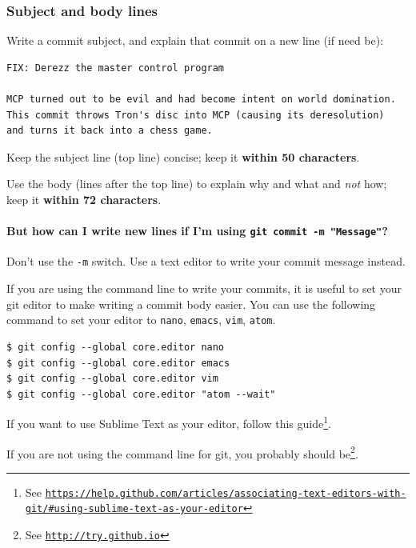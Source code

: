 \documentclass[12pt,a4paper,]{article}
\renewcommand{\href}[2]{#2\footnote{See \texttt{\url{#1}}}}
\let\oldparagraph\paragraph
\renewcommand{\paragraph}[1]{\oldparagraph{#1}\mbox{}}
\begin{document}
\hypertarget{subject-and-body-lines}{\subsubsection{Subject and body
lines}\label{subject-and-body-lines}}

Write a commit subject, and explain that commit on a new line (if need
be):

\begin{verbatim}
FIX: Derezz the master control program

MCP turned out to be evil and had become intent on world domination.
This commit throws Tron's disc into MCP (causing its deresolution)
and turns it back into a chess game.
\end{verbatim}

Keep the subject line (top line) concise; keep it \textbf{within 50
characters}.

Use the body (lines after the top line) to explain why and what and
\emph{not} how; keep it \textbf{within 72 characters}.

\paragraph{\texorpdfstring{But how can I write new lines if I'm using
\texttt{git\ commit\ -m\ "Message"}?}{But how can I write new lines if I'm using git commit -m "Message"?}}\label{but-how-can-i-write-new-lines-if-im-using-git-commit--m-message}

Don't use the \texttt{-m} switch. Use a text editor to write your commit
message instead.

If you are using the command line to write your commits, it is useful to
set your git editor to make writing a commit body easier. You can use
the following command to set your editor to \texttt{nano},
\texttt{emacs}, \texttt{vim}, \texttt{atom}.

\begin{verbatim}
$ git config --global core.editor nano
$ git config --global core.editor emacs
$ git config --global core.editor vim
$ git config --global core.editor "atom --wait"
\end{verbatim}

If you want to use Sublime Text as your editor, follow
\href{https://help.github.com/articles/associating-text-editors-with-git/\#using-sublime-text-as-your-editor}{this
guide}.

If you are not using the command line for git, you probably
\href{http://try.github.io}{should be}.
\end{document}
